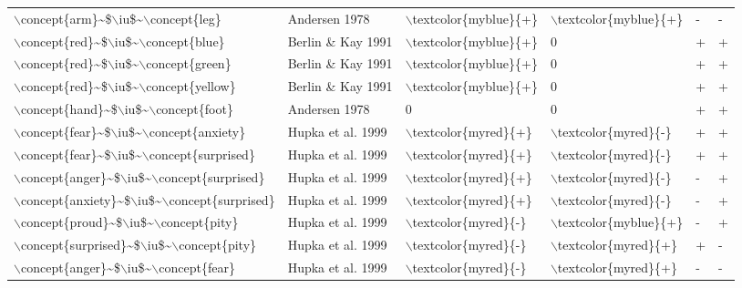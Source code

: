 \begin{longtable}{llllll}
  $\backslash$concept\{arm\}\~{}\$$\backslash$iu\$\~{}$\backslash$concept\{leg\} & Andersen 1978 & $\backslash$textcolor\{myblue\}\{+\} & $\backslash$textcolor\{myblue\}\{+\} & - & - \\ 
  $\backslash$concept\{red\}\~{}\$$\backslash$iu\$\~{}$\backslash$concept\{blue\} & Berlin \& Kay 1991 & $\backslash$textcolor\{myblue\}\{+\} & 0 & + & + \\ 
  $\backslash$concept\{red\}\~{}\$$\backslash$iu\$\~{}$\backslash$concept\{green\} & Berlin \& Kay 1991 & $\backslash$textcolor\{myblue\}\{+\} & 0 & + & + \\ 
  $\backslash$concept\{red\}\~{}\$$\backslash$iu\$\~{}$\backslash$concept\{yellow\} & Berlin \& Kay 1991 & $\backslash$textcolor\{myblue\}\{+\} & 0 & + & + \\ 
  $\backslash$concept\{hand\}\~{}\$$\backslash$iu\$\~{}$\backslash$concept\{foot\} & Andersen 1978 & 0 & 0 & + & + \\ 
  $\backslash$concept\{fear\}\~{}\$$\backslash$iu\$\~{}$\backslash$concept\{anxiety\} & Hupka et al. 1999 & $\backslash$textcolor\{myred\}\{+\} & $\backslash$textcolor\{myred\}\{-\} & + & + \\ 
  $\backslash$concept\{fear\}\~{}\$$\backslash$iu\$\~{}$\backslash$concept\{surprised\} & Hupka et al. 1999 & $\backslash$textcolor\{myred\}\{+\} & $\backslash$textcolor\{myred\}\{-\} & + & + \\ 
  $\backslash$concept\{anger\}\~{}\$$\backslash$iu\$\~{}$\backslash$concept\{surprised\} & Hupka et al. 1999 & $\backslash$textcolor\{myred\}\{+\} & $\backslash$textcolor\{myred\}\{-\} & - & + \\ 
  $\backslash$concept\{anxiety\}\~{}\$$\backslash$iu\$\~{}$\backslash$concept\{surprised\} & Hupka et al. 1999 & $\backslash$textcolor\{myred\}\{+\} & $\backslash$textcolor\{myred\}\{-\} & - & + \\ 
  $\backslash$concept\{proud\}\~{}\$$\backslash$iu\$\~{}$\backslash$concept\{pity\} & Hupka et al. 1999 & $\backslash$textcolor\{myred\}\{-\} & $\backslash$textcolor\{myblue\}\{+\} & - & + \\ 
  $\backslash$concept\{surprised\}\~{}\$$\backslash$iu\$\~{}$\backslash$concept\{pity\} & Hupka et al. 1999 & $\backslash$textcolor\{myred\}\{-\} & $\backslash$textcolor\{myred\}\{+\} & + & - \\ 
  $\backslash$concept\{anger\}\~{}\$$\backslash$iu\$\~{}$\backslash$concept\{fear\} & Hupka et al. 1999 & $\backslash$textcolor\{myred\}\{-\} & $\backslash$textcolor\{myred\}\{+\} & - & - \\ 

\end{longtable}

